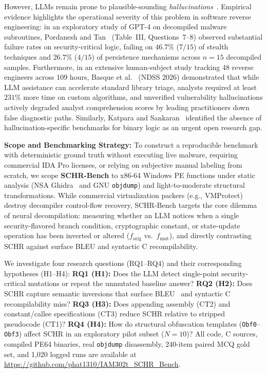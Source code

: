 \documentclass[conference]{IEEEtran}
\begin{document}
However, LLMs remain prone to plausible-sounding \textit{hallucinations}~\cite{ji2023hallucination,min2023factscore}. Empirical evidence highlights the operational severity of this problem in software reverse engineering: in an exploratory study of GPT-4 on decompiled malware subroutines, Pordanesh and Tan~\cite{pordanesh2024exploring} (Table~III, Questions~7--8) observed substantial failure rates on security-critical logic, failing on $46.7\%$ ($7/15$) of stealth techniques and $26.7\%$ ($4/15$) of persistence mechanisms across $n=15$ decompiled samples. Furthermore, in an extensive human-subject study tracking 48 reverse engineers across 109 hours, Basque et al.~\cite{basque2026decompiling} (NDSS 2026) demonstrated that while LLM assistance can accelerate standard library triage, analysts required at least $231\%$ more time on custom algorithms, and unverified vulnerability hallucinations actively degraded analyst comprehension scores by leading practitioners down false diagnostic paths. Similarly, Katpara and Sankaran~\cite{katpara2026firmware} identified the absence of hallucination-specific benchmarks for binary logic as an urgent open research gap.

\textbf{Scope and Benchmarking Strategy:} To construct a reproducible benchmark with deterministic ground truth without executing live malware, requiring commercial IDA Pro licenses, or relying on subjective manual labeling from scratch, we scope \textbf{SCHR-Bench} to x86-64 Windows PE functions under static analysis (NSA Ghidra~\cite{ghidra2024nsa} and GNU \texttt{objdump}) and light-to-moderate structural transformations. While commercial virtualization packers (e.g., VMProtect) destroy decompiler control-flow recovery, SCHR-Bench targets the core dilemma of neural decompilation: measuring whether an LLM notices when a single security-flavored branch condition, cryptographic constant, or state-update operation has been inverted or altered ($f_{\text{orig}}$ vs.\ $f_{\text{mut}}$), and directly contrasting SCHR against surface BLEU and syntactic C recompilability.

We investigate four research questions (RQ1--RQ4) and their corresponding hypotheses (H1--H4): \textbf{RQ1 (H1):} Does the LLM detect single-point security-critical mutations or repeat the unmutated baseline answer? \textbf{RQ2 (H2):} Does SCHR capture semantic inversions that surface BLEU~\cite{papineni2002bleu} and syntactic C recompilability miss? \textbf{RQ3 (H3):} Does appending assembly (CT2) and constant/callee specifications (CT3) reduce SCHR relative to stripped pseudocode (CT1)? \textbf{RQ4 (H4):} How do structural obfuscation templates (\texttt{Obf0}--\texttt{Obf3}) affect SCHR in an exploratory pilot subset ($N=10$)? All code, C sources, compiled PE64 binaries, real \texttt{objdump} disassembly, 240-item paired MCQ gold set, and 1,020 logged runs are available at \url{https://github.com/phat1310/IAM302t_SCHR_Bench}.
\end{document}
